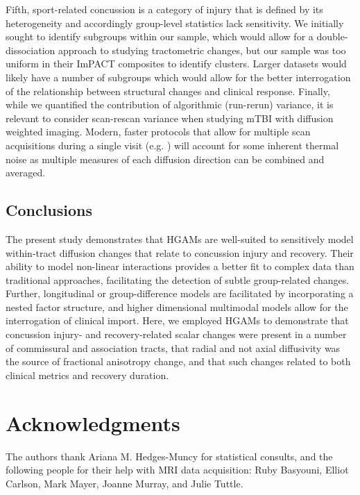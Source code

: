 \documentclass[12pt]{article}
\begin{document}
Fifth, sport-related concussion is a category of injury that is defined by its heterogeneity and accordingly group-level statistics lack sensitivity. We initially sought to identify subgroups within our sample, which would allow for a double-dissociation approach to studying tractometric changes, but our sample was too uniform in their ImPACT composites to identify clusters. Larger datasets would likely have a number of subgroups which would allow for the better interrogation of the relationship between structural changes and clinical response. Finally, while we quantified the contribution of algorithmic (run-rerun) variance, it is relevant to consider scan-rescan variance when studying mTBI with diffusion weighted imaging. Modern, faster protocols that allow for multiple scan acquisitions during a single visit (e.g. \cite{li2020EvaluationMultishellDiffusion}) will account for some inherent thermal noise as multiple measures of each diffusion direction can be combined and averaged.


\subsection{Conclusions}
\label{ssec:disc-conc}
The present study demonstrates that HGAMs are well-suited to sensitively model within-tract diffusion changes that relate to concussion injury and recovery. Their ability to model non-linear interactions provides a better fit to complex data than traditional approaches, facilitating the detection of subtle group-related changes. Further, longitudinal or group-difference models are facilitated by incorporating a nested factor structure, and higher dimensional multimodal models allow for the interrogation of clinical import. Here, we employed HGAMs to demonstrate that concussion injury- and recovery-related scalar changes were present in a number of commissural and association tracts, that radial and not axial diffusivity was the source of fractional anisotropy change, and that such changes related to both clinical metrics and recovery duration.


\section*{Acknowledgments}
\label{sec:ack}
The authors thank Ariana M. Hedges-Muncy for statistical consults, and the following people for their help with MRI data acquisition: Ruby Basyouni, Elliot Carlson, Mark Mayer, Joanne Murray, and Julie Tuttle.
\end{document}
